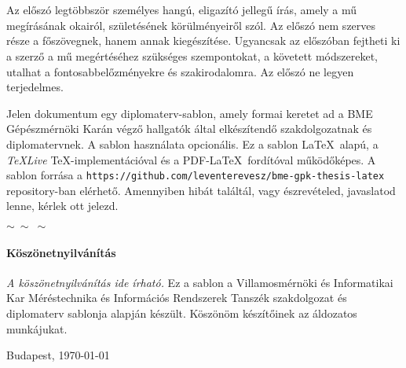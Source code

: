 

\selecthungarian

\chapter*{\eloszo}

Az előszó legtöbbször személyes hangú, eligazító jellegű írás, amely a mű megírásának okairól, születésének körülményeiről szól. Az előszó nem szerves része a főszövegnek, hanem annak kiegészítése.
Ugyancsak az előszóban fejtheti ki a szerző a mű megértéséhez szükséges szempontokat, a követett módszereket, utalhat a fontosabbelőzményekre és szakirodalomra.
Az előszó ne legyen terjedelmes.


\vspace{0.5cm}
Jelen dokumentum egy diplomaterv-sablon, amely formai keretet ad a BME Gépészmérnöki Karán végző hallgatók által elkészítendő szakdolgozatnak és diplomatervnek. A sablon használata opcionális. Ez a sablon \LaTeX~alapú, a \emph{TeXLive} \TeX-implementációval és a PDF-\LaTeX~fordítóval működőképes.
A sablon forrása a \verb+https://github.com/leventerevesz/bme-gpk-thesis-latex+ repository-ban elérhető.  Amennyiben hibát találtál, vagy észrevételed, javaslatod lenne, kérlek ott jelezd.


\begin{center}
    $\sim \: \sim \: \sim$
\end{center}


\subsubsection*{Köszönetnyilvánítás}
\emph{A köszönetnyilvánítás ide írható.} Ez a sablon a Villamosmérnöki és Informatikai Kar Méréstechnika és Információs Rendszerek Tanszék szakdolgozat és diplomaterv sablonja alapján készült. Köszönöm készítőinek az áldozatos munkájukat.


\vspace{0.5cm}

\begin{flushleft}
{Budapest, \today}
\end{flushleft}

\begin{flushright}
\emph{\szerzo}
\end{flushright}

\vfill
